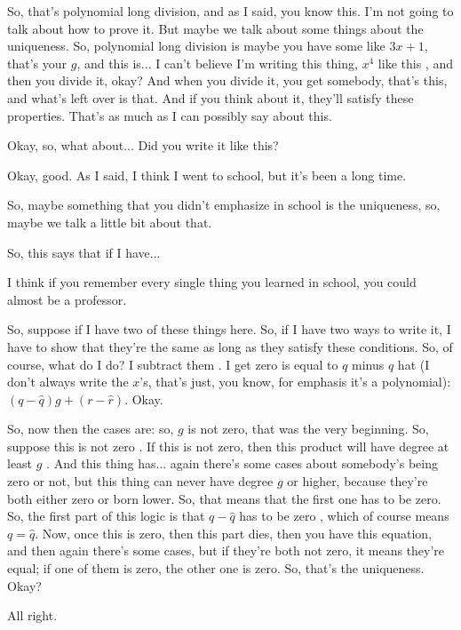 \begin{speech}[00:28:10 - 00:29:08]
So, that's polynomial long division, and as I said, you know this. I'm not going to talk about how to prove it. But maybe we talk about some things about the uniqueness. So, polynomial long division is maybe you have some like $3x + 1$, that's your $g$, and this is... I can't believe I'm writing this thing, $x^4$ like this , and then you divide it, okay? And when you divide it, you get somebody, that's this, and what's left over is that. And if you think about it, they'll satisfy these properties. That's as much as I can possibly say about this.

Okay, so, what about... Did you write it like this?

Okay, good. As I said, I think I went to school, but it's been a long time.

So, maybe something that you didn't emphasize in school is the uniqueness, so, maybe we talk a little bit about that.

So, this says that if I have... 
\end{speech}

\begin{speech}[00:29:08 - 00:30:46]
I think if you remember every single thing you learned in school, you could almost be a professor.

So, suppose if I have two of these things here. So, if I have two ways to write it, I have to show that they're the same as long as they satisfy these conditions. So, of course, what do I do? I subtract them . I get zero is equal to $q$ minus $q$ hat (I don't always write the $x$'s, that's just, you know, for emphasis it's a polynomial): $(q - \hat{q})g + (r - \hat{r})$. Okay.

So, now then the cases are: so, $g$ is not zero, that was the very beginning. So, suppose this is not zero . If this is not zero, then this product will have degree at least $g$ . And this thing has... again there's some cases about somebody's being zero or not, but this thing can never have degree $g$ or higher, because they're both either zero or born lower. So, that means that the first one has to be zero. So, the first part of this logic is that $q - \hat{q}$ has to be zero , which of course means $q = \hat{q}$. Now, once this is zero, then this part dies, then you have this equation, and then again there's some cases, but if they're both not zero, it means they're equal; if one of them is zero, the other one is zero. So, that's the uniqueness. Okay?

All right. 
\end{speech}

